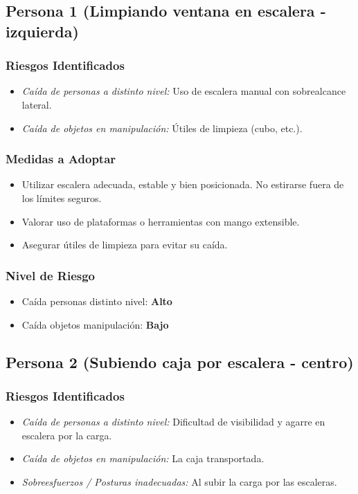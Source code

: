 \documentclass[12pt,a4paper]{article}
\begin{document}
	\subsection{Persona 1 (Limpiando ventana en escalera - izquierda)}
	
	\subsubsection{Riesgos Identificados}
	\begin{itemize}
		\item \textit{Caída de personas a distinto nivel:} Uso de escalera manual con sobrealcance lateral.
		\item \textit{Caída de objetos en manipulación:} Útiles de limpieza (cubo, etc.).
	\end{itemize}
	
	\subsubsection{Medidas a Adoptar}
	\begin{itemize}
		\item Utilizar escalera adecuada, estable y bien posicionada. No estirarse fuera de los límites seguros.
		\item Valorar uso de plataformas o herramientas con mango extensible.
		\item Asegurar útiles de limpieza para evitar su caída.
	\end{itemize}
	
	\subsubsection{Nivel de Riesgo}
	\begin{itemize}
		\item Caída personas distinto nivel: \textbf{Alto}
		\item Caída objetos manipulación: \textbf{Bajo}
	\end{itemize}
	
	\bigskip\hrulefill\bigskip
	
	\subsection{Persona 2 (Subiendo caja por escalera - centro)}
	
	\subsubsection{Riesgos Identificados}
	\begin{itemize}
		\item \textit{Caída de personas a distinto nivel:} Dificultad de visibilidad y agarre en escalera por la carga.
		\item \textit{Caída de objetos en manipulación:} La caja transportada.
		\item \textit{Sobreesfuerzos / Posturas inadecuadas:} Al subir la carga por las escaleras.
	\end{itemize}
	
\end{document}
